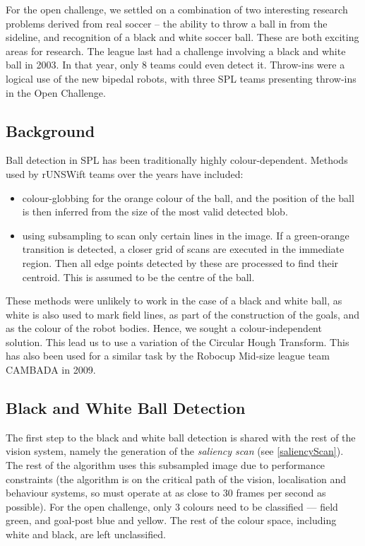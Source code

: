 \documentclass[pdftex,11pt,a4paper]{report}
\begin{document}
For the open challenge, we settled on a combination of two interesting
research problems derived from real soccer -- the ability to throw a ball
in from the sideline, and recognition of a black and white soccer
ball. These are both exciting areas for research. The league last had a
challenge involving a black and white ball in 2003\cite{challenges03}. In
that year, only 8 teams could even detect it\cite{LNAI2003-legged-team}.
Throw-ins were a logical use of the new bipedal robots, with three SPL
teams presenting throw-ins in the Open Challenge.

\subsection{Background}
Ball detection in SPL has been traditionally highly colour-dependent.
Methods used by rUNSWift teams over the years have included:
\begin{itemize}
    \item colour-globbing for the orange colour of the ball, and
        the position of the ball is then inferred from the size of the most
        valid detected blob.
    \item using subsampling to scan only certain lines in the image. If a
        green-orange transition is detected, a closer grid of scans are
        executed in the immediate region. Then all edge points detected by
        these are processed to find their centroid. This is assumed to be
        the centre of the ball\cite{north2005object}.
\end{itemize}
These methods were unlikely to work in the case of a black and white ball,
as white is also used to mark field lines, as part of the construction of
the goals, and as the colour of the robot bodies. Hence, we sought a
colour-independent solution. This lead us to use a variation of the
Circular Hough Transform\cite{rizon05object}. This has also been used for a
similar task by the Robocup Mid-size league team CAMBADA in
2009\cite{cambada08realtime}.

\subsection{Black and White Ball Detection}
The first step to the black and white ball detection is shared with the
rest of the vision system, namely the generation of the \emph{saliency
scan} (see \autoref{saliencyScan}). The rest of the algorithm uses this
subsampled image due to performance constraints (the algorithm is on the
critical path of the vision, localisation and behaviour systems, so must
operate at as close to 30 frames per second as possible). For the open
challenge, only 3 colours need to be classified --- field green, and goal-post
blue and yellow. The rest of the colour space, including white and black,
are left unclassified.
\end{document}
